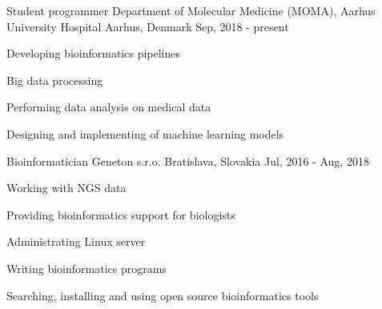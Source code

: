 
\begin{cventries}

\cventry
    {Student programmer} %
    {Department of Molecular Medicine (MOMA), Aarhus University Hospital} %
    {Aarhus, Denmark} %
    {Sep, 2018 - present} %
    {
        \begin{cvitems} %
            \item {Developing bioinformatics pipelines} 
            \item {Big data processing}
            \item {Performing data analysis on medical data}
            \item {Designing and implementing of machine learning models}
        \end{cvitems}
    }

\cventry
    {Bioinformatician} %
    {Geneton s.r.o.} %
    {Bratislava, Slovakia} %
    {Jul, 2016 - Aug, 2018} %
    {
        \begin{cvitems} %
            \item {Working with NGS data}
            \item {Providing bioinformatics support for biologists}
            \item {Administrating Linux server}
            \item {Writing bioinformatics programs}
            \item {Searching, installing and using open source bioinformatics tools}
        \end{cvitems}
    }

\end{cventries}
